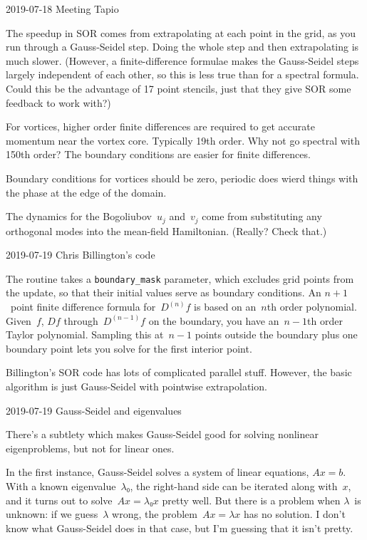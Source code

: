 2019-07-18 Meeting Tapio

The speedup in SOR comes from extrapolating at each point in the grid, as you run through a Gauss-Seidel step.  Doing the whole step and then extrapolating is much slower.  (However, a finite-difference formulae makes the Gauss-Seidel steps largely independent of each other, so this is less true than for a spectral formula.  Could this be the advantage of 17 point stencils, just that they give SOR some feedback to work with?)

For vortices, higher order finite differences are required to get accurate momentum near the vortex core.  Typically 19th order.  Why not go spectral with 150th order?  The boundary conditions are easier for finite differences.

Boundary conditions for vortices should be zero, periodic does wierd things with the phase at the edge of the domain.

The dynamics for the Bogoliubov~$u_j$ and~$v_j$ come from substituting any orthogonal modes into the mean-field Hamiltonian.  (Really?  Check that.) 

2019-07-19 Chris Billington's code

The routine takes a {\tt boundary\_mask} parameter, which excludes grid points from the update, so that their initial values serve as boundary conditions.  An $n+1$~point finite difference formula for~$D^{(n)}f$ is based on an~$n$th order polynomial.  Given~$f$, $Df$ through~$D^{(n-1)}f$ on the boundary, you have an~$n-1$th order Taylor polynomial.  Sampling this at~$n-1$ points outside the boundary plus one boundary point lets you solve for the first interior point.

Billington's SOR code has lots of complicated parallel stuff.  However, the basic algorithm is just Gauss-Seidel with pointwise extrapolation.

2019-07-19 Gauss-Seidel and eigenvalues

There's a subtlety which makes Gauss-Seidel good for solving nonlinear eigenproblems, but not for linear ones.

In the first instance, Gauss-Seidel solves a system of linear equations, $Ax=b$.  With a known eigenvalue~$λ₀$, the right-hand side can be iterated along with~$x$, and it turns out to solve~$Ax=λ₀x$ pretty well.  But there is a problem when $λ$~is unknown: if we guess~$λ$ wrong, the problem~$Ax=λx$ has no solution.  I don't know what Gauss-Seidel does in that case, but I'm guessing that it isn't pretty.

